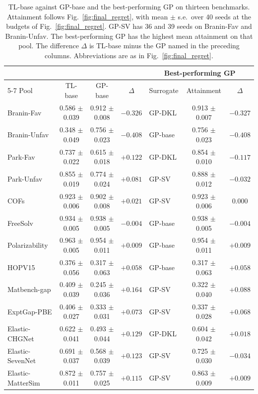 \begin{table}[p]
\centering
\scriptsize
\caption{TL-base against GP-base and the best-performing GP on thirteen benchmarks. Attainment follows Fig.~\ref{fig:final_regret}, with mean $\pm$ s.e.\ over 40 seeds at the budgets of Fig.~\ref{fig:final_regret}. GP-SV has 36 and 39 seeds on Branin-Fav and Branin-Unfav. The best-performing GP has the highest mean attainment on that pool. The difference $\Delta$ is TL-base minus the GP named in the preceding columns. Abbreviations are as in Fig.~\ref{fig:final_regret}.}
\label{supptab:tlbase_vs_gp}
\setlength{\tabcolsep}{4pt}%
\begin{tabular}{@{}l ccc lcc@{}}
\toprule
& & & & \multicolumn{3}{c}{Best-performing GP} \\
\cmidrule(lr){5-7}
Pool & TL-base & GP-base & $\Delta$ & Surrogate & Attainment & $\Delta$ \\
\midrule
Branin-Fav & 0.586 $\pm$ 0.039 & 0.912 $\pm$ 0.008 & $-0.326$ & GP-DKL & 0.913 $\pm$ 0.007 & $-0.327$ \\
Branin-Unfav & 0.348 $\pm$ 0.049 & 0.756 $\pm$ 0.023 & $-0.408$ & GP-base & 0.756 $\pm$ 0.023 & $-0.408$ \\
Park-Fav & 0.737 $\pm$ 0.022 & 0.615 $\pm$ 0.018 & $+0.122$ & GP-DKL & 0.854 $\pm$ 0.010 & $-0.117$ \\
Park-Unfav & 0.855 $\pm$ 0.019 & 0.774 $\pm$ 0.024 & $+0.081$ & GP-SV & 0.888 $\pm$ 0.012 & $-0.032$ \\
COFs & 0.923 $\pm$ 0.006 & 0.902 $\pm$ 0.008 & $+0.021$ & GP-SV & 0.923 $\pm$ 0.006 & $0.000$ \\
FreeSolv & 0.934 $\pm$ 0.005 & 0.938 $\pm$ 0.005 & $-0.004$ & GP-base & 0.938 $\pm$ 0.005 & $-0.004$ \\
Polarizability & 0.963 $\pm$ 0.005 & 0.954 $\pm$ 0.011 & $+0.009$ & GP-base & 0.954 $\pm$ 0.011 & $+0.009$ \\
HOPV15 & 0.376 $\pm$ 0.056 & 0.317 $\pm$ 0.063 & $+0.058$ & GP-base & 0.317 $\pm$ 0.063 & $+0.058$ \\
Matbench-gap & 0.409 $\pm$ 0.039 & 0.245 $\pm$ 0.036 & $+0.164$ & GP-SV & 0.322 $\pm$ 0.040 & $+0.088$ \\
ExptGap-PBE & 0.406 $\pm$ 0.027 & 0.333 $\pm$ 0.031 & $+0.073$ & GP-SV & 0.337 $\pm$ 0.028 & $+0.068$ \\
Elastic-CHGNet & 0.622 $\pm$ 0.041 & 0.493 $\pm$ 0.044 & $+0.129$ & GP-DKL & 0.604 $\pm$ 0.042 & $+0.018$ \\
Elastic-SevenNet & 0.691 $\pm$ 0.037 & 0.568 $\pm$ 0.039 & $+0.123$ & GP-SV & 0.725 $\pm$ 0.030 & $-0.034$ \\
Elastic-MatterSim & 0.872 $\pm$ 0.011 & 0.757 $\pm$ 0.025 & $+0.115$ & GP-SV & 0.863 $\pm$ 0.009 & $+0.009$ \\
\bottomrule
\end{tabular}
\end{table}

